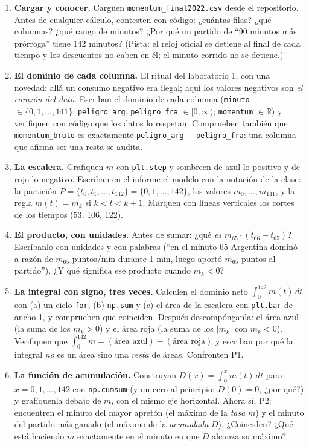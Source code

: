\documentclass[12pt,letterpaper]{article}
\begin{document}
\begin{enumerate}[label=\arabic*.]
    \item \textbf{Cargar y conocer.} Carguen \texttt{momentum\_final2022.csv} desde el repositorio. Antes de cualquier cálculo, contesten con código: ¿cuántas filas? ¿qué columnas? ¿qué rango de minutos? ¿Por qué un partido de ``90 minutos más prórroga'' tiene 142 minutos? (Pista: el reloj oficial se detiene al final de cada tiempo y los descuentos no caben en él; el minuto corrido no se detiene.)
    \item \textbf{El dominio de cada columna.} El ritual del laboratorio 1, con una novedad: allá un consumo negativo era ilegal; aquí los valores negativos son \emph{el corazón del dato}. Escriban el dominio de cada columna (\texttt{minuto} $\in\{0,1,\ldots,141\}$; \texttt{peligro\_arg}, \texttt{peligro\_fra} $\in[0,\infty)$; \texttt{momentum} $\in\mathbb{R}$) y verifiquen con código que los datos lo respetan. Comprueben también que \texttt{momentum\_bruto} es exactamente \texttt{peligro\_arg} $-$ \texttt{peligro\_fra}: una columna que afirma ser una resta se audita.
    \item \textbf{La escalera.} Grafiquen $m$ con \texttt{plt.step} y sombreen de azul lo positivo y de rojo lo negativo. Escriban en el informe el modelo con la notación de la clase: la partición $P=\{t_0,t_1,\ldots,t_{142}\}=\{0,1,\ldots,142\}$, los valores $m_0,\ldots,m_{141}$, y la regla $m(t)=m_k$ si $k<t<k+1$. Marquen con líneas verticales los cortes de los tiempos (53, 106, 122).
    \item \textbf{El producto, con unidades.} Antes de sumar: ¿qué \emph{es} $m_{65}\cdot(t_{66}-t_{65})$? Escríbanlo con unidades y con palabras (``en el minuto 65 Argentina dominó a razón de $m_{65}$ puntos/min durante 1 min, luego aportó $m_{65}$ puntos al partido''). ¿Y qué significa ese producto cuando $m_k<0$?
    \item \textbf{La integral con signo, tres veces.} Calculen el dominio neto $\int_0^{142} m(t)\,dt$ con (a) un ciclo \texttt{for}, (b) \texttt{np.sum} y (c) el área de la escalera con \texttt{plt.bar} de ancho 1, y comprueben que coinciden. Después descompónganla: el área azul (la suma de los $m_k>0$) y el área roja (la suma de los $|m_k|$ con $m_k<0$). Verifiquen que $\int_0^{142}m = (\text{área azul})-(\text{área roja})$ y escriban por qué la integral \emph{no} es un área sino una \emph{resta} de áreas. Confronten P1.
    \item \textbf{La función de acumulación.} Construyan $D(x)=\int_0^x m(t)\,dt$ para $x=0,1,\ldots,142$ con \texttt{np.cumsum} (y un cero al principio: $D(0)=0$, ¿por qué?) y grafíquenla debajo de $m$, con el mismo eje horizontal. Ahora sí, P2: encuentren el minuto del mayor apretón (el máximo de la \emph{tasa} $m$) y el minuto del partido más ganado (el máximo de la \emph{acumulada} $D$). ¿Coinciden? ¿Qué está haciendo $m$ exactamente en el minuto en que $D$ alcanza su máximo?

\end{enumerate}
\end{document}
